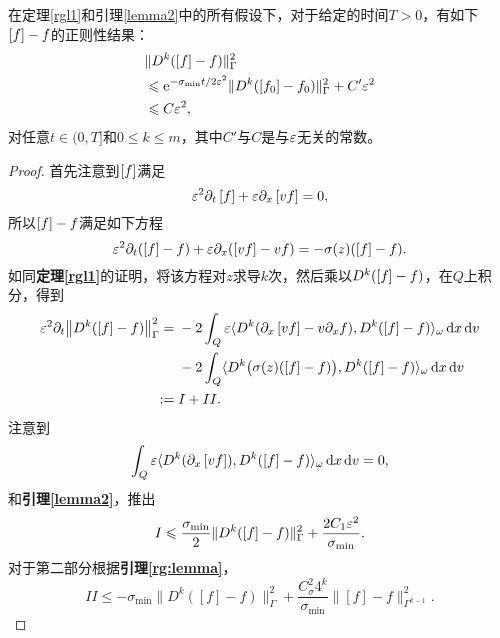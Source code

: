 \begin{thm}\label{rgl2}
  在定理\ref{rgl1}和引理\ref{lemma2}中的所有假设下，对于给定的时间$T>0$，有如下$\left[ f \right] - f$的正则性结果：
  \begin{equation}\label{est2}
    \begin{split}
      &\|D^k(\left[ f \right]-f)\|^2_{\Gamma
      }
      \\
      &\leqslant \mathrm{e}^{-\sigma_{\mathrm{min}}t/2\varepsilon^2}\|D^k(\left[ f_0 \right]-f_0)\|^2_{\Gamma} + C'\varepsilon^2
      \\
      & \leqslant C\varepsilon^2,
    \end{split}
  \end{equation}
  对任意$t\in(0,T]$和$0\le k\le m$，其中$C'$与$C$是与$\varepsilon$无关的常数。
\end{thm}
\begin{proof}
  首先注意到$\left[ f \right]$满足
  \begin{equation}
    \varepsilon^2\partial_t\left[ f \right] + \varepsilon \partial_x\left[ v f \right] = 0,
  \end{equation}
  所以$\left[ f \right]-f$满足如下方程
  \begin{equation}
    \varepsilon^2\partial_t(\left[ f \right]-f) + \varepsilon\partial_x(\left[ v f \right] - vf) = -\sigma(z)(\left[ f \right]-f).
  \end{equation}
  如同{\bf 定理\ref{rgl1}}的证明，将该方程对$z$求导$k$次，然后乘以$D^k(\left[ f \right]-f)$，在$Q$上积分，得到
  \begin{equation}
    \begin{split}
      \varepsilon^2\partial_t\big\|D^k(\left[ f \right]-f)\big\|^2_{\Gamma} =
      {} & -2\int_Q\varepsilon\langle D^k(\partial_x\left[ v f \right] - v\partial_x f), D^k(\left[ f \right]-f)\rangle_\omega\mathop{}\!\mathrm{d} x\mathop{}\!\mathrm{d} v
      \\
      {} & -2\int_Q \langle D^k\big(\sigma(z)(\left[ f \right]-f)\big),D^k (\left[ f \right]-f) \rangle_{\omega}\mathop{}\!\mathrm{d} x\mathop{}\!\mathrm{d} v
      \\
      := {} & I + II.
    \end{split}
  \end{equation}
  注意到
  \begin{equation}
    \int_Q\varepsilon\langle D^k(\partial_x\left[ v f \right]), D^k(\left[ f \right]-f)\rangle_\omega\mathop{}\!\mathrm{d} x\mathop{}\!\mathrm{d} v=0,
  \end{equation}
  和{\bf 引理\ref{lemma2}}，推出
  \begin{equation}
    I \leqslant \frac{\sigma_{\mathrm{min}}}{2}\|D^k(\left[ f \right]-f)\|^2_{\Gamma} + \frac{2C_1\varepsilon^2}{\sigma_{\mathrm{min}}}.
  \end{equation}
  对于第二部分根据{\bf 引理\ref{rg:lemma}}，
  \begin{equation}
    II\le -\sigma_{\mathrm{min}}\big\|D^{k}([f] - f)\big\|^2_{\Gamma} + \frac{C_\sigma^2 4^{k}}{\sigma_{\mathrm{min}}}\big\|[f] - f\big\|^2_{\Gamma^{k-1}}.

\end{equation}
\end{proof}
